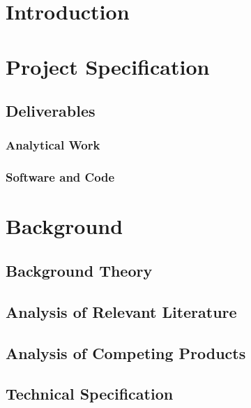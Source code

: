 \documentclass[12pt,oneside]{report}
\begin{document}


\tableofcontents
\newpage

\chapter{Introduction}


\chapter{Project Specification} \label{ProjectSpec}

\section{Deliverables}

\subsection{Analytical Work}
\subsection{Software and Code}



\chapter{Background}

\section{Background Theory}


\section{Analysis of Relevant Literature} \label{BackgroundLit}


\section{Analysis of Competing Products}

\section{Technical Specification}
\end{document}
